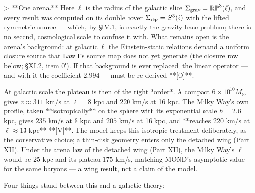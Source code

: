> **One arena.** Here $\ell$ is the radius of the galactic slice $\Sigma_{\rm grav} = \mathbb{RP}^3(\ell)$, and every result was computed on its double cover $\Sigma_{\rm rep} = S^3(\ell)$ with the lifted, symmetric source — which, by §IV.1, is exactly the gravity-base problem; there is no second, cosmological scale to confuse it with. What remains open is the arena's background: at galactic $\ell$ the Einstein-static relations demand a uniform closure source that Law I's source map does not yet generate (the closure row below; §XI.2, item 0′). If that background is ever replaced, the linear operator — and with it the coefficient $2.994$ — must be re-derived **[O]**.

At galactic scale the plateau is then of the right *order*. A compact $6\times10^{10}M_\odot$ gives $v\approx311$ km/s at $\ell = 8$ kpc and 220 km/s at 16 kpc. The Milky Way's own profile, taken **isotropically** on the sphere with its exponential scale $h = 2.6$ kpc, gives $235$ km/s at 8 kpc and $205$ km/s at 16 kpc, and **reaches 220 km/s at $\ell\approx13$ kpc** **[V]**. The model keeps this isotropic treatment deliberately, as the conservative choice; a thin-disk geometry enters only the detached wing (Part XII). Under the arena law of the detached wing (Part XII), the Milky Way's $\ell$ would be $25$ kpc and its plateau $175$ km/s, matching MOND's asymptotic value for the same baryons — a wing result, not a claim of the model.

Four things stand between this and a galactic theory:

